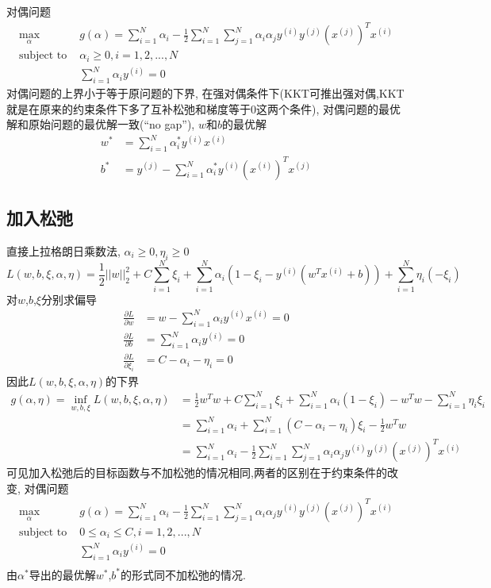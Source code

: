 \documentclass[12pt,letterpaper]{article}
\begin{document}
对偶问题
\[
	\begin{split} 
	\max_{\alpha} \quad &g(\alpha) =\sum_{i=1}^{N}\alpha_i - \frac{1}{2} \sum_{i=1}^{N}  \sum_{j=1}^N
	\alpha_i\alpha_j y^{(i)}y^{(j)} (x^{(j)})^Tx^{(i)}  \\
	\text{subject to } & \alpha_i \geq 0 , i = 1,2,...,N\\
	& \sum_{i=1}^{N} \alpha_iy^{(i)} = 0
	\end{split} 
\]
对偶问题的上界小于等于原问题的下界, 
在强对偶条件下(KKT可推出强对偶,KKT就是在原来的约束条件下多了互补松弛和梯度等于0这两个条件), 对偶问题的最优解和原始问题的最优解一致(``no gap''),
$w$和$b$的最优解
\[ \begin{split} 
	w^* &= \sum_{i=1}^{N} \alpha_i^* y^{(i)}x^{(i)} \\
	b^* &= y^{(j)} - \sum_{i=1}^{N}\alpha_i^* y^{(i)}(x^{(i)})^T x^{(j)}
	\end{split} 
\]
\subsection{加入松弛}
直接上拉格朗日乘数法, $\alpha_i \geq 0,\eta_i \geq 0$
\[
  L(w,b,\xi,\alpha,\eta) = \frac{1}{2}{||w||_2^2} + C\sum_{i=1}^{N} \xi_i	+ \sum_{i=1}^{N}\alpha_i 
  (1 - \xi_i -  y^{(i)}(w^Tx^{(i)}+b)  )
  + \sum_{i=1}^{N} \eta_i (-\xi_i)
\]
对$w$,$b$,$\xi$分别求偏导
\[
	\begin{split} 
	  \frac{\partial L}{\partial w} &= w - \sum_{i=1}^{N} \alpha_i y^{(i)}x^{(i)}	= 0 \\
	  \frac{\partial L}{\partial b} &= \sum_{i=1}^{N} \alpha_i y^{(i)} = 0 \\
	  \frac{\partial L}{\partial \xi_i} &= C - \alpha_i - \eta_i = 0
	\end{split} 
\]
因此$L(w,b,\xi,\alpha,\eta)$的下界
\[ \begin{split} 
	g(\alpha,\eta) = \inf_{w,b,\xi} L(w,b,\xi,\alpha,\eta) &=   \frac{1}{2}w^Tw + C\sum_{i=1}^{N}\xi_i + \sum_{i=1}^{N}\alpha_i(1-\xi_i)  
	-w^Tw - \sum_{i=1}^{N}\eta_i \xi_i\\
	&= \sum_{i=1}^{N}\alpha_i+ \sum_{i=1}^{N} (C -\alpha_i -\eta_i)\xi_i  - \frac{1}{2}w^Tw \\
	&= \sum_{i=1}^{N}\alpha_i - \frac{1}{2} \sum_{i=1}^{N}  \sum_{j=1}^N
	\alpha_i\alpha_j y^{(i)}y^{(j)} (x^{(j)})^Tx^{(i)} 
	\end{split} 
\]
可见加入松弛后的目标函数与不加松弛的情况相同,两者的区别在于约束条件的改变, 对偶问题
\[
	\begin{split} 
	\max_{\alpha} \quad &g(\alpha) =\sum_{i=1}^{N}\alpha_i - \frac{1}{2} \sum_{i=1}^{N}  \sum_{j=1}^N
	\alpha_i\alpha_j y^{(i)}y^{(j)} (x^{(j)})^Tx^{(i)}  \\
	\text{subject to }
	 & 0 \leq \alpha_i \leq C, i = 1,2,...,N\\
	& \sum_{i=1}^{N} \alpha_iy^{(i)} = 0 \\
	\end{split} 
\]
由$\alpha^*$导出的最优解$w^*$,$b^*$的形式同不加松弛的情况.
\end{document}
